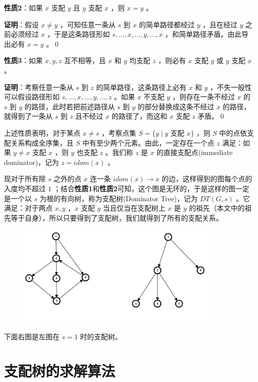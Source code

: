 \documentclass{noithesis}
\begin{document}
\textbf{性质2}：如果 $x$ 支配 $y$ 且 $y$ 支配 $x$ ，则 $x=y$ 。

\textbf{证明}：假设 $x\neq y$ ，可知任意一条从 $s$ 到 $x$ 的简单路径都经过 $y$ ，且在经过 $y$ 之前必须经过 $x$ ，于是这条路径形如 $s,\dots,x,\dots,y,\dots,x$ ，和简单路径矛盾。由此导出必有 $x=y$ 。\qed

\textbf{性质3}：如果 $x,y,z$ 互不相等，且 $x$ 和 $y$ 均支配 $z$ ，则必有 $x$ 支配 $y$ 或 $y$ 支配 $x$ 。

\textbf{证明}：考察任意一条从 $s$ 到 $z$ 的简单路径，这条路径上必有 $x$ 和 $y$ ，不失一般性可以假设路径形如 $s,\dots,x,\dots,y,\dots,z$ 。如果 $x$ 不支配 $y$ ，则存在一条不经过 $x$ 的 $s$ 到 $y$ 的路径，此时若把前述路径从 $s$ 到 $y$ 的部分替换成这条不经过 $x$ 的路径，就得到了一条从 $s$ 到 $z$ 且不经过 $x$ 的路径了，而这和 $x$ 支配 $z$ 矛盾。\qed

上述性质表明，对于某点 $x\neq s$ ，考察点集 $S = \{y\mid y\text{ 支配\ }x\}$ ，则 $S$ 中的点依支配关系构成全序集，且 $S$ 中有至少两个元素。由此，一定存在一个点 $z$ 满足：如果 $y\neq x$ 支配 $x$ ，则 $y$ 也支配 $z$ 。我们称 $z$ 是 $x$ 的直接支配点(immediate dominator)，记为 $z=idom(x)$ 。

现对于所有除 $s$ 之外的点 $x$ 连一条 $idom(x)\rightarrow x$ 的边，这样得到的图每个点的入度均不超过 $1$ ；结合\textbf{性质1}和\textbf{性质2}可知，这个图是无环的，于是这样的图一定是一个以 $s$ 为根的有向树，称为支配树(Dominator Tree)，记为 $DT(G, s)$ 。它满足：对于两点 $x,y$ ，$x$ 支配 $y$ 当且仅当在支配树上 $x$ 是 $y$ 的祖先（本文中的祖先等于自身），所以只要得到了支配树，我们就得到了所有的支配关系。

\begin{figure}[h]
	\centering
	\includegraphics[width=0.9\textwidth]{graph2.png}
\end{figure}

下面右图是左图在 $s=1$ 时的支配树。

\section{支配树的求解算法}
\end{document}
